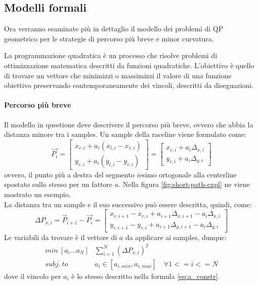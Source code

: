 \subsection{Modelli formali}
Ora verranno esaminate più in dettaglio il modello dei problemi di QP
geometrico per le strategie di percorso più breve e minor curvatura.

La programmazione quadratica è un processo che risolve problemi di ottimizzazione matematica descritti da
funzioni quadratiche. L'obiettivo è quello di trovare un vettore che minimizzi o massimizzi il valore di
una funzione obiettivo preservando contemporaneamente dei vincoli, descritti da diseguazioni.

\paragraph{Percorso più breve}\cite{race-model}\cite{globalplanning-lec}
Il modello in questione deve descrivere il percorso più breve, ovvero che abbia la distanza minore tra i
samples. Un sample della raceline viene formulato come:
\[
	\overrightarrow{P_i} = 
		\begin{bmatrix}
			x_{r,i} + a_i(x_{l,i} - x_{r,i})\\
			y_{r,i} + a_i(y_{l,i} - y_{r,i})
		\end{bmatrix} = 
		\begin{bmatrix}
			x_{r,i} + a_i\Delta_{x,i}\\
			y_{r,i} + a_i\Delta_{y,i}
		\end{bmatrix} 
\]
ovvero, il punto più a destra del segmento $i$esimo ortogonale alla centerline spostato sullo stesso per
un fattore $a$. Nella figura \ref{fig:short-path-expl} ne viene mostrato un esempio.\\
La distanza tra un sample e il suo successivo può essere descritta, quindi, come:
\[
	\Delta P_{x, i} = \overrightarrow{P}_{i+1} - \overrightarrow{P_i} = \begin{bmatrix}
		x_{r,i+1} - x_{r,i} + a_{i+1}\Delta_{x,i+1} - a_i\Delta_{x, i}\\
		y_{r,i+1} - y_{r,i} + a_{i+1}\Delta_{y,i+1} - a_i\Delta_{y, i}
	\end{bmatrix}
\]
Le variabili da trovare è il vettore di $a$ da applicare ai samples, dunque:
\[
	\begin{aligned}
		min\ [a_i \dots a_N] & \sum_{i=1}^{N} (\Delta P_{x,i})^2 \\
		subj.\ to\ & a_i \in [a_{i, min}, a_{i, max}] \quad \forall 1 <= i <= N
	\end{aligned}
\]
dove il vincolo per $a_i$ è lo stesso descritto nella formula \ref{eq:a_constr}.

